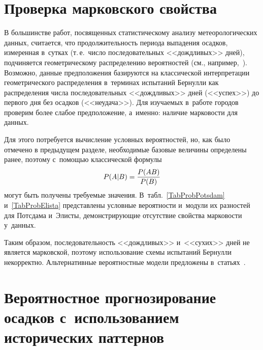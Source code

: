 \begin{multicols}{2}
\vspace*{-6pt}


\section{Проверка марковского свойства}

\vspace*{-2pt}

В большинстве работ, посвященных статистическому
анализу метеорологических данных, считается, что продолжительность периода
выпадения осадков, измеренная в~сутках (т.\,е.\ число последовательных
<<дождливых>> дней), подчиняется гео\-мет\-ри\-че\-ско\-му распределению
вероятностей (см., например,~\cite{Zolina2013}). Возможно, данные предположения
базируются на классической интерпретации гео\-мет\-ри\-че\-ско\-го распределения 
в~терминах испытаний Бернулли как распределения числа последовательных
<<дождливых>> дней (<<успех>>) до первого дня без осадков (<<неудача>>). Для
изучаемых в~работе городов проверим более слабое предположение, а~именно:
наличие марковости для данных.



Для этого потребуется вычисление условных вероятностей, но, как было отмечено
в предыдущем разделе, необходимые базовые величины определены ранее,
поэтому с~помощью классической формулы
\begin{equation*}
P(A|B)=\displaystyle\frac{\displaystyle P(AB)\mathstrut}{\displaystyle P(B)\mathstrut}
\end{equation*}
могут быть получены требуемые значения. В~табл.~\ref{TabProbPotsdam}
и~\ref{TabProbElista} представлены условные вероятности и~модули их разностей
для Потсдама и~Элисты, демонстрирующие отсутствие свойства марковости 
у~данных.



Таким образом, последовательность <<дождливых>> и~<<сухих>> дней
не является марковской, поэтому использование схемы испытаний Бернулли
некорректно. Альтернативные вероятностные модели предложены в~статьях~\cite{Gorshenin2017a,Gorshenin2017b}.

\vspace*{-4pt}

\section{Вероятностное прогнозирование осадков 
с~использованием исторических паттернов}

\vspace*{-2pt}


\end{multicols}
